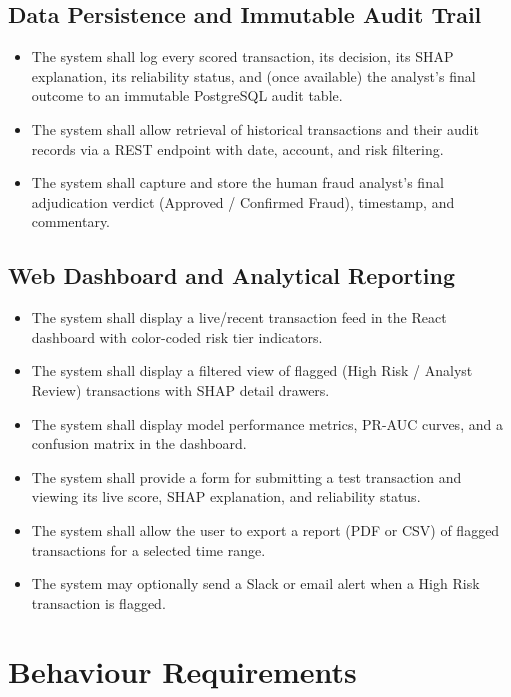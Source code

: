 \documentclass[12pt, a4paper]{report}
\begin{document}
\subsection{Data Persistence and Immutable Audit Trail}
\begin{itemize}
    \item[\textbf{FR-10}] The system shall log every scored transaction, its decision, its SHAP explanation, its reliability status, and (once available) the analyst's final outcome to an immutable PostgreSQL audit table.
    \item[\textbf{FR-11}] The system shall allow retrieval of historical transactions and their audit records via a REST endpoint with date, account, and risk filtering.
    \item[\textbf{FR-12}] The system shall capture and store the human fraud analyst's final adjudication verdict (Approved / Confirmed Fraud), timestamp, and commentary.
\end{itemize}

\subsection{Web Dashboard and Analytical Reporting}
\begin{itemize}
    \item[\textbf{FR-13}] The system shall display a live/recent transaction feed in the React dashboard with color-coded risk tier indicators.
    \item[\textbf{FR-14}] The system shall display a filtered view of flagged (High Risk / Analyst Review) transactions with SHAP detail drawers.
    \item[\textbf{FR-15}] The system shall display model performance metrics, PR-AUC curves, and a confusion matrix in the dashboard.
    \item[\textbf{FR-16}] The system shall provide a form for submitting a test transaction and viewing its live score, SHAP explanation, and reliability status.
    \item[\textbf{FR-17}] The system shall allow the user to export a report (PDF or CSV) of flagged transactions for a selected time range.
    \item[\textbf{FR-18}] The system may optionally send a Slack or email alert when a High Risk transaction is flagged.
\end{itemize}

\section{Behaviour Requirements}
\end{document}
